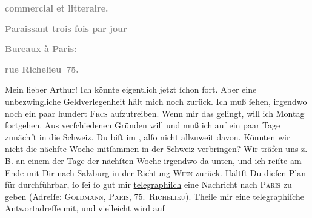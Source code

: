 \begin{ledgroupsized}[t]{13cm}
           \pstart
           \begin{otherlanguage}{french}\textcolor{gray}{\textbf{commercial et litteraire.}}\end{otherlanguage}\pend
           \pstart
           \begin{otherlanguage}{french}\textcolor{gray}{\textbf{\textbf{Paraissant trois fois par jour}}}\end{otherlanguage}\pend
           \pstart
           \begin{otherlanguage}{french}\textcolor{gray}{\textbf{\textbf{Bureaux à Paris:}}}\end{otherlanguage}\pend
           \pstart
           \begin{otherlanguage}{french}\textcolor{gray}{\textbf{\textbf{rue Richelieu 75.}}}\end{otherlanguage}\pend
           \pstart\center{}Mein lieber Arthur!\pend\pstart
           Ich könnte eigentlich jetzt ſchon fort. Aber eine unbezwingliche Geldverlegenheit
               hält mich noch zurück. Ich muß ſehen, irgendwo noch ein paar hundert \textsc{Frcs} aufzutreiben. Wenn mir das gelingt, will ich Montag fortgehen\textcolor{gray}{.} Aus verſchiedenen
               Gründen will und muß ich auf ein paar Tage zunächſt in die Schweiz. Du biſt im \label{K_L02713-1v}\label{K_L02713-1h}, alſo nicht allzuweit davon. Könnten wir nicht
               die nächſte Woche mitſammen {\pb}in der Schweiz verbringen? Wir träfen uns z. B. an einem der Tage
               der nächſten Woche irgendwo da unten, und ich reiſte am Ende mit Dir nach Salzburg in der Richtung \textsc{Wien} zurück. Hältſt Du dieſen Plan für durchführbar, ſo ſei ſo gut mir \uline{telegraphiſch} eine Nachricht nach \textsc{Paris} zu geben (Adreſſe: \textsc{Goldmann}, \textsc{Paris, 75. Richelieu}). Theile mir eine telegraphiſche Antwortadreſſe mit, und vielleicht wird auf

\end{ledgroupsized}
